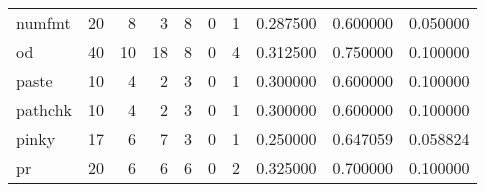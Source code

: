 \begin{tabular}{lrrrrrrrrr}
numfmt    &                                      20 &                                                  8 &                                                  3 &                                                  8 &                                                  0 &                                                  1 &                                           0.287500 &                               0.600000 &                             0.050000 \\
od        &                                      40 &                                                 10 &                                                 18 &                                                  8 &                                                  0 &                                                  4 &                                           0.312500 &                               0.750000 &                             0.100000 \\
paste     &                                      10 &                                                  4 &                                                  2 &                                                  3 &                                                  0 &                                                  1 &                                           0.300000 &                               0.600000 &                             0.100000 \\
pathchk   &                                      10 &                                                  4 &                                                  2 &                                                  3 &                                                  0 &                                                  1 &                                           0.300000 &                               0.600000 &                             0.100000 \\
pinky     &                                      17 &                                                  6 &                                                  7 &                                                  3 &                                                  0 &                                                  1 &                                           0.250000 &                               0.647059 &                             0.058824 \\
pr        &                                      20 &                                                  6 &                                                  6 &                                                  6 &                                                  0 &                                                  2 &                                           0.325000 &                               0.700000 &                             0.100000 \\

\end{tabular}
